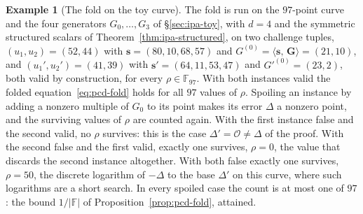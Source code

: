 \documentclass[11pt,a4paper]{article}
\theoremstyle{definition}
\newtheorem{example}[theorem]{Example}
\newcommand{\F}{\mathbb{F}}
\newcommand{\ip}[2]{\langle #1,\, #2 \rangle}
\begin{document}
\begin{example}[The fold on the toy curve]\label{ex:pcd-fold}
The fold is run on the $97$-point curve and the four generators
$G_0, \dots, G_3$ of \S\ref{sec:ipa-toy}, with $d = 4$ and the
symmetric structured scalars of Theorem~\ref{thm:ipa-structured}, on
two challenge tuples, $(u_1, u_2) = (52, 44)$ with
$\mathbf s = (80, 10, 68, 57)$ and
$G^{(0)} = \ip{\mathbf s}{\mathbf G} = (21, 10)$, and
$(u_1', u_2') = (41, 39)$ with $\mathbf s' = (64, 11, 53, 47)$ and
$G'^{(0)} = (23, 2)$, both valid by construction, for every
$\rho \in \F_{97}$. With both instances valid the folded
equation~\eqref{eq:pcd-fold} holds for all $97$ values of $\rho$.
Spoiling an instance by adding a nonzero multiple of $G_0$ to its point
makes its error $\Delta$ a nonzero point, and the surviving values of
$\rho$ are counted again. With the first instance false and the second
valid, no $\rho$ survives: this is the case $\Delta' = \mathcal O
\ne \Delta$ of the proof. With the second false and the first valid,
exactly one survives, $\rho = 0$, the value that discards the second
instance altogether. With both false exactly one survives, $\rho = 50$,
the discrete logarithm of $-\Delta$ to the base $\Delta'$ on this curve,
where such logarithms are a short search. In every spoiled case the
count is at most one of $97$: the bound $1/|\F|$ of
Proposition~\ref{prop:pcd-fold}, attained.
\end{example}
\end{document}
